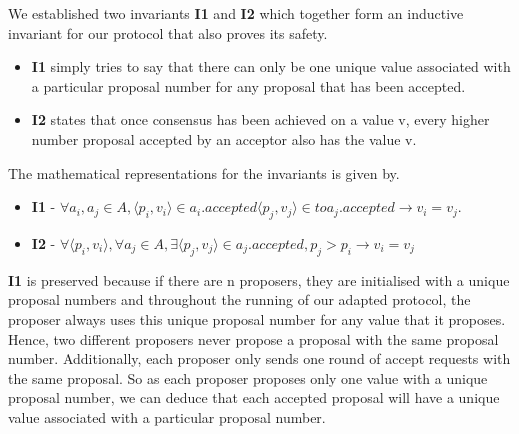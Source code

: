 We established two invariants \textbf{I1} and \textbf{I2} which together form an inductive
invariant for our protocol that also proves its safety.

\begin{itemize}
  \item \textbf{I1} simply tries to say that there can only be one unique value
    associated with a particular proposal number for any proposal that has been accepted.
  \item \textbf{I2} states that once consensus has been achieved on a value v,
    every higher number proposal accepted by an acceptor also has the value v.
\end{itemize}

The mathematical representations for the invariants is given by.
\begin{itemize}
  \item \textbf{I1} - $\forall a_i, a_j \in A, \langle p_i, v_i \rangle \in a_{i}.accepted
  \langle p_j, v_j \rangle \in to a_{j}.accepted \rightarrow v_i = v_j$.
  \item \textbf{I2} - $\forall \langle p_i, v_i \rangle,
    \forall a_j \in A, \exists \langle p_j, v_j \rangle \in a_{j}.accepted,
    p_j > p_i \rightarrow v_i = v_j$
\end{itemize}

\textbf{I1} is preserved because if there are n proposers, they are
initialised with a unique proposal numbers and throughout the running of our
adapted protocol, the proposer always uses this unique proposal number for any
value that it proposes. Hence, two different proposers never propose a proposal
with the same proposal number. Additionally, each proposer only sends one round
of accept requests with the same proposal. So as each proposer proposes only one
value with a unique proposal number, we can deduce that each accepted proposal
will have a unique value associated with a particular proposal number.

%

